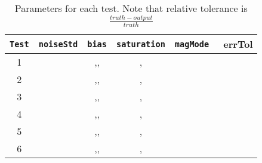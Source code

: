 \begin{table}[htbp]
	\caption{Parameters for each test. Note that relative tolerance is $\frac{truth - output}{truth}$}
	\label{tab:errortol}
	\centering \fontsize{10}{10}\selectfont
	\begin{tabular}{ c | c | c | c | c | c } %
	\hline\hline
	
		
		{\tt Test} & {\tt noiseStd} & {\tt bias} & {\tt saturation} & \tt{magMode} & \textbf{errTol}\\ \hline\hline
		1 
		& 
		&,,
		&,
		&
		&	   \\ \hline
		
		2 
		& 
		&,,
		&,
		&
		&	   \\ \hline
		
		3 
		& 
		&,,
		&,
		&
		&	   \\ \hline
		
		4 
		& 
		&,,
		&,
		&
		&	   \\ \hline
		
		5 
		& 
		&,,
		&,
		&
		&	   \\ \hline
		
		6 
		& 
		&,,
		&,
		&
		&	   \\ \hline
		

\end{tabular}
\end{table}
